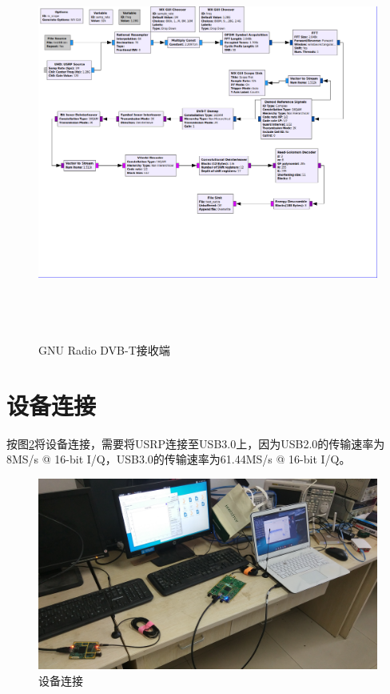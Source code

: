 		\begin{figure}[htb]
			\centering
			\includegraphics[height=13cm,angle=-90]{figures/dvbt_rx.png}
			\caption{GNU Radio DVB-T接收端}
			\label{fig:gnuradio_dvbt_rx}
		\end{figure}
	\section{设备连接}
		\par 按图\ref{fig:devices}将设备连接，需要将USRP连接至USB3.0上，因为USB2.0的传输速率为8MS/s @ 16-bit I/Q，USB3.0的传输速率为61.44MS/s @ 16-bit I/Q\cite{USRP:SamplingRates}。
		\begin{figure}[htp]
			\centering
			\includegraphics[width=13cm]{figures/devices.jpg}
			\caption{设备连接}
			\label{fig:devices}
		\end{figure}
